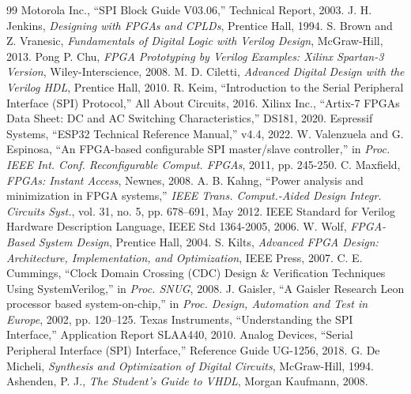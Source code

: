 \documentclass[conference]{IEEEtran}
\begin{document}
\begin{thebibliography}{99}
 Motorola Inc., ``SPI Block Guide V03.06,'' Technical Report, 2003.
 J. H. Jenkins, \textit{Designing with FPGAs and CPLDs}, Prentice Hall, 1994.
 S. Brown and Z. Vranesic, \textit{Fundamentals of Digital Logic with Verilog Design}, McGraw-Hill, 2013.
 Pong P. Chu, \textit{FPGA Prototyping by Verilog Examples: Xilinx Spartan-3 Version}, Wiley-Interscience, 2008.
 M. D. Ciletti, \textit{Advanced Digital Design with the Verilog HDL}, Prentice Hall, 2010.
 R. Keim, ``Introduction to the Serial Peripheral Interface (SPI) Protocol,'' All About Circuits, 2016.
 Xilinx Inc., ``Artix-7 FPGAs Data Sheet: DC and AC Switching Characteristics,'' DS181, 2020.
 Espressif Systems, ``ESP32 Technical Reference Manual,'' v4.4, 2022.
 W. Valenzuela and G. Espinosa, ``An FPGA-based configurable SPI master/slave controller,'' in \textit{Proc. IEEE Int. Conf. Reconfigurable Comput. FPGAs}, 2011, pp. 245-250.
 C. Maxfield, \textit{FPGAs: Instant Access}, Newnes, 2008.
 A. B. Kahng, ``Power analysis and minimization in FPGA systems,'' \textit{IEEE Trans. Comput.-Aided Design Integr. Circuits Syst.}, vol. 31, no. 5, pp. 678--691, May 2012.
 IEEE Standard for Verilog Hardware Description Language, IEEE Std 1364-2005, 2006.
 W. Wolf, \textit{FPGA-Based System Design}, Prentice Hall, 2004.
 S. Kilts, \textit{Advanced FPGA Design: Architecture, Implementation, and Optimization}, IEEE Press, 2007.
 C. E. Cummings, ``Clock Domain Crossing (CDC) Design \& Verification Techniques Using SystemVerilog,'' in \textit{Proc. SNUG}, 2008.
 J. Gaisler, ``A Gaisler Research Leon processor based system-on-chip,'' in \textit{Proc. Design, Automation and Test in Europe}, 2002, pp. 120--125.
 Texas Instruments, ``Understanding the SPI Interface,'' Application Report SLAA440, 2010.
 Analog Devices, ``Serial Peripheral Interface (SPI) Interface,'' Reference Guide UG-1256, 2018.
 G. De Micheli, \textit{Synthesis and Optimization of Digital Circuits}, McGraw-Hill, 1994.
 Ashenden, P. J., \textit{The Student's Guide to VHDL}, Morgan Kaufmann, 2008.
\end{thebibliography}
\end{document}
